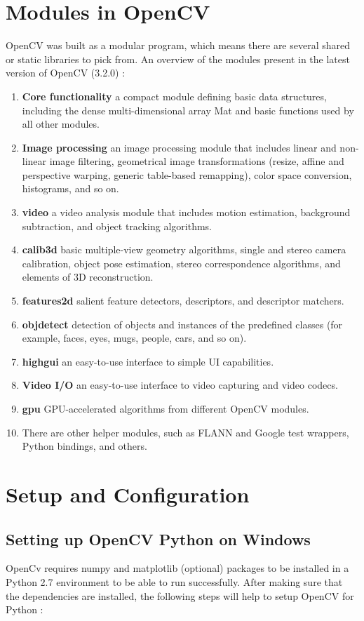 \documentclass[9pt,twocolumn,twoside]{styles/osajnl}
\begin{document}
\section{Modules in OpenCV}
OpenCV was built as a modular program, which means there are several shared or static libraries to pick from. An overview of the modules present in the latest version of OpenCV (3.2.0) \cite{www-opencv-intro}:
\begin{enumerate}
    \item \textbf{Core functionality} a compact module defining basic data structures, including the dense multi-dimensional array Mat and basic functions used by all other modules.
    \item \textbf{Image processing} an image processing module that includes linear and non-linear image filtering, geometrical image transformations (resize, affine and perspective warping, generic table-based remapping), color space conversion, histograms, and so on.
    \item \textbf{video} a video analysis module that includes motion estimation, background subtraction, and object tracking algorithms.
    \item \textbf{calib3d} basic multiple-view geometry algorithms, single and stereo camera calibration, object pose estimation, stereo correspondence algorithms, and elements of 3D reconstruction.
    \item \textbf{features2d} salient feature detectors, descriptors, and descriptor matchers.
    \item \textbf{objdetect} detection of objects and instances of the predefined classes (for example, faces, eyes, mugs, people, cars, and so on).
    \item \textbf{highgui} an easy-to-use interface to simple UI capabilities.
    \item \textbf{Video I/O} an easy-to-use interface to video capturing and video codecs.
    \item \textbf{gpu} GPU-accelerated algorithms from different OpenCV modules.
    \item  There are other helper modules, such as FLANN and Google test wrappers, Python bindings, and others.
\end{enumerate}


\section{Setup and Configuration}
\subsection{Setting up OpenCV Python on Windows}
OpenCv requires numpy and matplotlib (optional) packages to be installed in a Python 2.7 environment to be able to run successfully. After making sure that the dependencies are installed, the following steps will help to setup OpenCV for Python \cite{www-opencv-python}:
\end{document}
